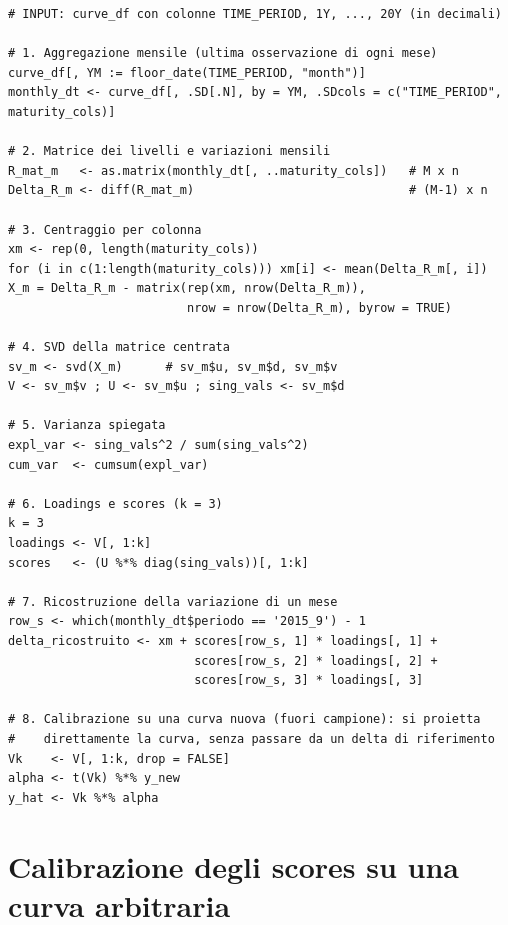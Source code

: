\documentclass[11pt,a4paper]{article}
\theoremstyle{plain}
\theoremstyle{definition}
\theoremstyle{remark}
\begin{document}
\begin{algobox}
\begin{Verbatim}[fontsize=\small]
# INPUT: curve_df con colonne TIME_PERIOD, 1Y, ..., 20Y (in decimali)

# 1. Aggregazione mensile (ultima osservazione di ogni mese)
curve_df[, YM := floor_date(TIME_PERIOD, "month")]
monthly_dt <- curve_df[, .SD[.N], by = YM, .SDcols = c("TIME_PERIOD", maturity_cols)]

# 2. Matrice dei livelli e variazioni mensili
R_mat_m   <- as.matrix(monthly_dt[, ..maturity_cols])   # M x n
Delta_R_m <- diff(R_mat_m)                              # (M-1) x n

# 3. Centraggio per colonna
xm <- rep(0, length(maturity_cols))
for (i in c(1:length(maturity_cols))) xm[i] <- mean(Delta_R_m[, i])
X_m = Delta_R_m - matrix(rep(xm, nrow(Delta_R_m)),
                         nrow = nrow(Delta_R_m), byrow = TRUE)

# 4. SVD della matrice centrata
sv_m <- svd(X_m)      # sv_m$u, sv_m$d, sv_m$v
V <- sv_m$v ; U <- sv_m$u ; sing_vals <- sv_m$d

# 5. Varianza spiegata
expl_var <- sing_vals^2 / sum(sing_vals^2)
cum_var  <- cumsum(expl_var)

# 6. Loadings e scores (k = 3)
k = 3
loadings <- V[, 1:k]
scores   <- (U %*% diag(sing_vals))[, 1:k]

# 7. Ricostruzione della variazione di un mese
row_s <- which(monthly_dt$periodo == '2015_9') - 1
delta_ricostruito <- xm + scores[row_s, 1] * loadings[, 1] +
                          scores[row_s, 2] * loadings[, 2] +
                          scores[row_s, 3] * loadings[, 3]

# 8. Calibrazione su una curva nuova (fuori campione): si proietta
#    direttamente la curva, senza passare da un delta di riferimento
Vk    <- V[, 1:k, drop = FALSE]
alpha <- t(Vk) %*% y_new
y_hat <- Vk %*% alpha
\end{Verbatim}
\end{algobox}


\section{Calibrazione degli scores su una curva arbitraria}
\label{sec:calibrazione}
\end{document}
